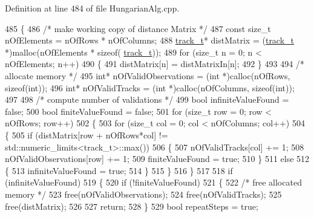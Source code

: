 Definition at line 484 of file Hungarian\+Alg.\+cpp.


\begin{DoxyCode}
485 \{
486     \textcolor{comment}{/* make working copy of distance Matrix */}
487     \textcolor{keyword}{const} \textcolor{keywordtype}{size\_t} nOfElements = nOfRows * nOfColumns;
488     \mbox{\hyperlink{defines_8h_a7ce9c8817b42ab418e61756f579549ab}{track\_t}}* distMatrix = (\mbox{\hyperlink{defines_8h_a7ce9c8817b42ab418e61756f579549ab}{track\_t}} *)malloc(nOfElements * \textcolor{keyword}{sizeof}(
      \mbox{\hyperlink{defines_8h_a7ce9c8817b42ab418e61756f579549ab}{track\_t}}));
489     \textcolor{keywordflow}{for} (\textcolor{keywordtype}{size\_t} n = 0; n < nOfElements; n++)
490     \{
491         distMatrix[n] = distMatrixIn[n];
492     \}
493 
494     \textcolor{comment}{/* allocate memory */}
495     \textcolor{keywordtype}{int}* nOfValidObservations = (\textcolor{keywordtype}{int} *)calloc(nOfRows, \textcolor{keyword}{sizeof}(\textcolor{keywordtype}{int}));
496     \textcolor{keywordtype}{int}* nOfValidTracks = (\textcolor{keywordtype}{int} *)calloc(nOfColumns, \textcolor{keyword}{sizeof}(\textcolor{keywordtype}{int}));
497 
498     \textcolor{comment}{/* compute number of validations */}
499     \textcolor{keywordtype}{bool} infiniteValueFound = \textcolor{keyword}{false};
500     \textcolor{keywordtype}{bool} finiteValueFound = \textcolor{keyword}{false};
501     \textcolor{keywordflow}{for} (\textcolor{keywordtype}{size\_t} row = 0; row < nOfRows; row++)
502     \{
503         \textcolor{keywordflow}{for} (\textcolor{keywordtype}{size\_t} col = 0; col < nOfColumns; col++)
504         \{
505             \textcolor{keywordflow}{if} (distMatrix[row + nOfRows*col] != std::numeric\_limits<track\_t>::max())
506             \{
507                 nOfValidTracks[col] += 1;
508                 nOfValidObservations[row] += 1;
509                 finiteValueFound = \textcolor{keyword}{true};
510             \}
511             \textcolor{keywordflow}{else}
512             \{
513                 infiniteValueFound = \textcolor{keyword}{true};
514             \}
515         \}
516     \}
517 
518     \textcolor{keywordflow}{if} (infiniteValueFound)
519     \{
520         \textcolor{keywordflow}{if} (!finiteValueFound)
521         \{
522             \textcolor{comment}{/* free allocated memory */}
523             free(nOfValidObservations);
524             free(nOfValidTracks);
525             free(distMatrix);
526 
527             \textcolor{keywordflow}{return};
528         \}
529         \textcolor{keywordtype}{bool} repeatSteps = \textcolor{keyword}{true};

\end{DoxyCode}
